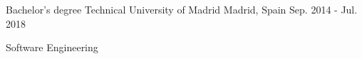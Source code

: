 

\begin{cventries}

  \cventry
  {Bachelor's degree} %
  {Technical University of Madrid} %
  {Madrid, Spain} %
  {Sep. 2014 - Jul. 2018} %
  {
    \begin{cvitems} %
      \item {Software Engineering}
    \end{cvitems}
  }

\end{cventries}
